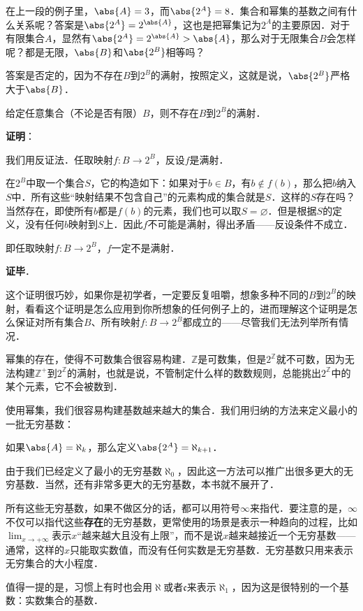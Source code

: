 在上一段的例子里，$\abs{A}=3$，而$\abs{2^A}=8$．集合和幂集的基数之间有什么关系呢？答案是$\abs{2^A}=2^{\abs{A}}$，这也是把幂集记为$2^A$的主要原因．对于有限集合$A$，显然有$\abs{2^A}=2^{\abs{A}}>\abs{A}$，那么对于无限集合$B$会怎样呢？都是无限，$\abs{B}$和$\abs{2^B}$相等吗？

答案是否定的，因为不存在$B$到$2^B$的满射，按照定义，这就是说，$\abs{2^B}$严格大于$\abs{B}$．

\begin{theorem}{}
给定任意集合（不论是否有限）$B$，则不存在$B$到$2^B$的满射．
\end{theorem}

\textbf{证明}：

我们用反证法．任取映射$f:B\rightarrow 2^B$，反设$f$是满射．

在$2^B$中取一个集合$S$，它的构造如下：如果对于$b\in B$，有$b\not\in f(b)$，那么把$b$纳入$S$中．所有这些“映射结果不包含自己”的元素构成的集合就是$S$．这样的$S$存在吗？当然存在，即使所有$b$都是$f(b)$的元素，我们也可以取$S=\varnothing$．但是根据$S$的定义，没有任何$b$映射到$S$上．因此$f$不可能是满射，得出矛盾——反设条件不成立．

即任取映射$f:B\rightarrow 2^B$，$f$一定不是满射．

\textbf{证毕}．

这个证明很巧妙，如果你是初学者，一定要反复咀嚼，想象多种不同的$B$到$2^B$的映射，看看这个证明是怎么应用到你所想象的任何例子上的，进而理解这个证明是怎么保证对所有集合$B$、所有映射$f:B\rightarrow 2^B$都成立的——尽管我们无法列举所有情况．

幂集的存在，使得不可数集合很容易构建．$\mathbb{Z}$是可数集，但是$2^{\mathbb{Z}}$就不可数，因为无法构建$\mathbb{Z}^+$到$2^{\mathbb{Z}}$的满射，也就是说，不管制定什么样的数数规则，总能挑出$2^{\mathbb{Z}}$中的某个元素，它不会被数到．

使用幂集，我们很容易构建基数越来越大的集合．我们用归纳的方法来定义最小的一批无穷基数：
\begin{definition}{}
如果$\abs{A}=\aleph_k$，那么定义$\abs{2^A}=\aleph_{k+1}$．
\end{definition}
由于我们已经定义了最小的无穷基数$\aleph_0$，因此这一方法可以推广出很多更大的无穷基数．当然，还有非常多更大的无穷基数，本书就不展开了．

所有这些无穷基数，如果不做区分的话，都可以用符号$\infty$来指代．要注意的是，$\infty$不仅可以指代这些\textbf{存在}的无穷基数，更常使用的场景是表示一种趋向的过程，比如$\lim_{x\rightarrow +\infty}$表示$x$“越来越大且没有上限”，而不是说$x$越来越接近一个无穷基数——通常，这样的$x$只能取实数值，而没有任何实数是无穷基数．无穷基数只用来表示无穷集合的大小程度．

值得一提的是，习惯上有时也会用$\aleph$或者$\mathfrak{c}$来表示$\aleph_1$，因为这是很特别的一个基数：实数集合的基数．









